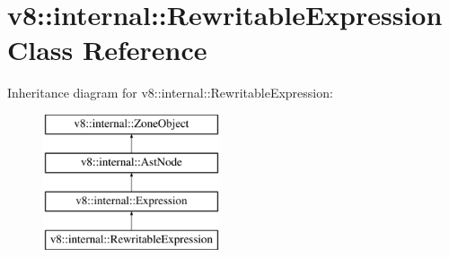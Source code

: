 \hypertarget{classv8_1_1internal_1_1RewritableExpression}{}\section{v8\+:\+:internal\+:\+:Rewritable\+Expression Class Reference}
\label{classv8_1_1internal_1_1RewritableExpression}
Inheritance diagram for v8\+:\+:internal\+:\+:Rewritable\+Expression\+:\begin{figure}[H]
\begin{center}
\leavevmode
\includegraphics[height=4.000000cm]{classv8_1_1internal_1_1RewritableExpression}
\end{center}
\end{figure}
